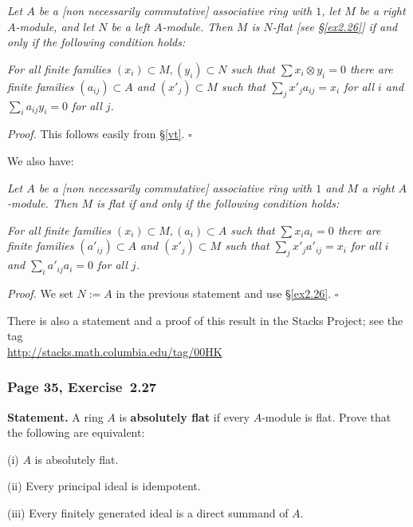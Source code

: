 \documentclass[12pt,letterpaper]{article}%
\newcommand{\nn}{\noindent}
\begin{document}
\nn\emph{Let $A$ be a [non necessarily commutative] associative ring with $1$, let $M$ be a right $A$-module, and let $N$ be a left $A$-module. Then $M$ is $N$-flat [see \S\ref{ex2.26}] if and only if the following condition holds:}

\nn\emph{For all finite families $(x_i)\subset M,(y_i)\subset N$ such that $\sum x_i\otimes y_i=0$ there are finite families $(a_{ij})\subset A$ and $(x'_j)\subset M$ such that $\sum_jx'_ja_{ij}=x_i$ for all $i$ and $\sum_ia_{ij}y_i=0$ for all $j$.}

\nn\emph{Proof.} This follows easily from \S\ref{vt}. $\square$

We also have:

\nn\emph{Let $A$ be a [non necessarily commutative] associative ring with $1$ and $M$ a right $A$-module. Then $M$ is flat if and only if the following condition holds:}

\nn\emph{For all finite families $(x_i)\subset M,(a_i)\subset A$ such that $\sum x_ia_i=0$ there are finite families $(a'_{ij})\subset A$ and $(x'_j)\subset M$ such that $\sum_jx'_ja'_{ij}=x_i$ for all $i$ and $\sum_ia'_{ij}a_i=0$ for all $j$.}

\nn\emph{Proof.} We set $N:=A$ in the previous statement and use \S\ref{ex2.26}. $\square$

There is also a statement and a proof of this result in the Stacks Project; see the tag\\  \href{http://stacks.math.columbia.edu/tag/00HK}{http://stacks.math.columbia.edu/tag/00HK}

\subsubsection{Page 35, Exercise~2.27}\label{ex2.27}%

\textbf{Statement.} A ring $A$ is \textbf{absolutely flat} if every $A$-module is flat. Prove that the following are equivalent:

\nn(i) $A$ is absolutely flat.

\nn(ii) Every principal ideal is idempotent.

\nn(iii) Every finitely generated ideal is a direct summand of $A$.
\end{document}
